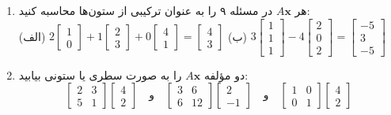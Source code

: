 \documentclass[12pt, a4paper]{book}
\begin{document}
\begin{enumerate}[label=\arabic*.]
		\item
		هر $A\mathbf{x}$ در مسئله ۹ را به عنوان ترکیبی از ستون‌ها محاسبه کنید: \\
		(الف) \( 2\begin{bmatrix} 1 \\ 0 \end{bmatrix} + 1\begin{bmatrix} 2 \\ 3 \end{bmatrix} + 0\begin{bmatrix} 4 \\ 1 \end{bmatrix} = \begin{bmatrix} 4 \\ 3 \end{bmatrix} \)
		(ب) \( 3\begin{bmatrix} 1 \\ 1 \\ 1 \end{bmatrix} - 4\begin{bmatrix} 2 \\ 0 \\ 2 \end{bmatrix} = \begin{bmatrix} -5 \\ 3 \\ -5 \end{bmatrix} \)
		
		\item
		دو مؤلفه $A\mathbf{x}$ را به صورت سطری یا ستونی بیابید:
		\[ \begin{bmatrix} 2 & 3 \\ 5 & 1 \end{bmatrix} \begin{bmatrix} 4 \\ 2 \end{bmatrix} \quad \text{و} \quad \begin{bmatrix} 3 & 6 \\ 6 & 12 \end{bmatrix} \begin{bmatrix} 2 \\ -1 \end{bmatrix} \quad \text{و} \quad \begin{bmatrix} 1 & 0 \\ 0 & 1 \end{bmatrix} \begin{bmatrix} 4 \\ 2 \end{bmatrix} \]
		

\end{enumerate}
\end{document}
